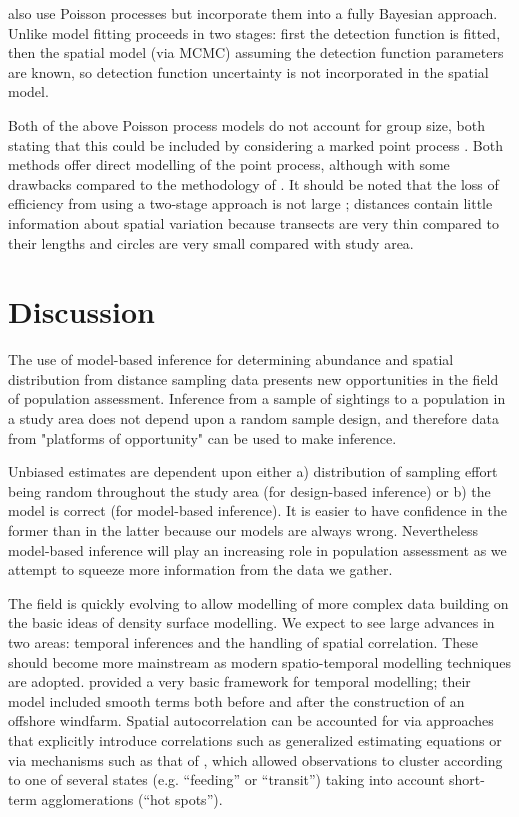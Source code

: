 \documentclass[a4paper,12pt]{article}
\begin{document}
\cite{Niemi:2010kx} also use Poisson processes but incorporate them into a fully Bayesian approach. Unlike \cite{Johnson:2010gf} model fitting proceeds in two stages: first the detection function is fitted, then the spatial model (via MCMC) assuming the detection function parameters are known, so detection function uncertainty is not incorporated in the spatial model.

Both of the above Poisson process models do not account for group size, both stating that this could be included by considering a marked point process \citep[Section 5.5]{cox1980point}. Both methods offer direct modelling of the point process, although with some drawbacks compared to the methodology of \cite{Hedley:2004et}. It should be noted that the loss of efficiency from using a two-stage approach is not large \citep[p. 313]{Buckland:2004ts}; distances contain little information about spatial variation because transects are very thin compared to their lengths and circles are very small compared with study area.


\section*{Discussion}
\label{s:discussion}

The use of model-based inference for determining abundance and spatial distribution from distance sampling data presents new opportunities in the field of population assessment.   Inference from a sample of sightings to a population in a study area does not depend upon a random sample design, and therefore data from "platforms of opportunity" \citep{Williams:2006tz} can be used to make inference.

Unbiased estimates are dependent upon either a) distribution of sampling effort being random throughout the study area (for design-based inference) or b) the model is correct (for model-based inference).  It is easier to have confidence in the former than in the latter because our models are always wrong. Nevertheless model-based inference will play an increasing role in population assessment as we attempt to squeeze more information from the data we gather.

The field is quickly evolving to allow modelling of more complex data building on the basic ideas of density surface modelling. We expect to see large advances in two areas: temporal inferences and the handling of spatial correlation. These should become more mainstream as modern spatio-temporal modelling techniques are adopted. \cite{Petersen:2011vy} provided a very basic framework for temporal modelling; their model included smooth terms both before and after the construction of an offshore windfarm. Spatial autocorrelation can be accounted for via approaches that explicitly introduce correlations such as generalized estimating equations \cite[GEEs;][]{Hardin:2003uf} or via mechanisms such as that of \cite{Skaug:2006gs}, which allowed observations to cluster according to one of several states (e.g. ``feeding'' or ``transit'') taking into account short-term agglomerations (``hot spots'').
\end{document}

